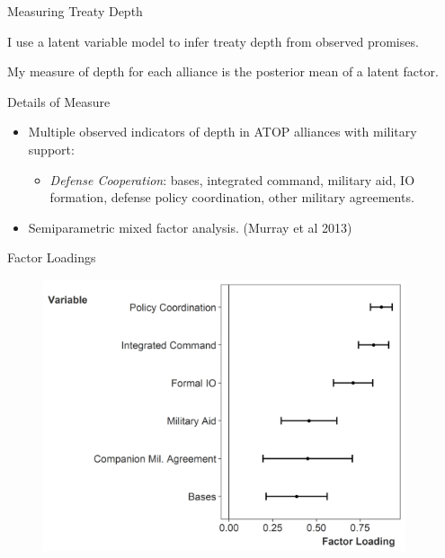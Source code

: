 \documentclass[12pt]{beamer}
\begin{document}

\begin{frame}{Measuring Treaty Depth}

I use a latent variable model to infer treaty depth from observed promises. 

\pause 

My measure of depth for each alliance is the posterior mean of a latent factor. 

\end{frame} 


\begin{frame}{Details of Measure}
 
\begin{itemize}
\item Multiple observed indicators of depth in ATOP alliances with military support: 
\begin{itemize} 
\item \textit{Defense Cooperation}: bases, integrated command, military aid, IO formation, defense policy coordination, other military agreements. 
\end{itemize} 
\pause 
\item Semiparametric mixed factor analysis. (Murray et al 2013)
\end{itemize} 


\end{frame} 


\begin{frame}{Factor Loadings}


\begin{figure}
	\centering
		\includegraphics[width=0.95\textwidth]{factor-loadings.png}
\end{figure}


\end{frame}
\end{document}
